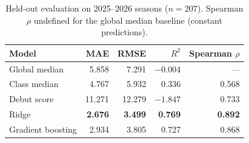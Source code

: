 \begin{table}[t]
\centering
\caption{Held-out evaluation on 2025--2026 seasons ($n=207$). Spearman $\rho$ undefined for the global median baseline (constant predictions).}
\label{tab:holdout-metrics}
\small
\setlength{\tabcolsep}{4pt}
\begin{tabular}{lrrrr}
\toprule
Model & MAE & RMSE & $R^2$ & Spearman $\rho$ \\
\midrule
Global median       & 5.858 & 7.291 & $-0.004$ & --- \\
Class median        & 4.767 & 5.932 & 0.336  & 0.568 \\
Debut score         & 11.271 & 12.279 & $-1.847$ & 0.733 \\
\midrule
Ridge               & \textbf{2.676} & \textbf{3.499} & \textbf{0.769} & \textbf{0.892} \\
Gradient boosting   & 2.934 & 3.805 & 0.727 & 0.868 \\
\bottomrule
\end{tabular}
\end{table}
